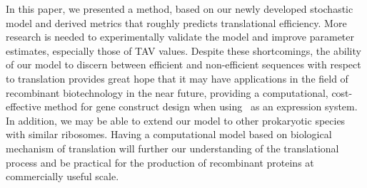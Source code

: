 \documentclass[12pt]{article}
\begin{document}
In this paper, we presented a method, based on our newly
developed stochastic model and derived metrics that roughly predicts
translational efficiency.  More research is needed to
experimentally validate the model and improve parameter
estimates, especially those of TAV values. Despite these
shortcomings, the ability of our model to discern between efficient
and non-efficient sequences with respect to translation 
provides great hope that it may have applications in the field of
recombinant biotechnology in the near future, providing a
computational, cost-effective method for gene construct
design when using \ecoli\ as an expression system.  In addition, 
we may be able to extend our model to other prokaryotic species with 
similar ribosomes.  Having a computational model based on biological
mechanism of translation will further our understanding of the
translational process and be practical for the production of
recombinant proteins at commercially useful scale.

{}
\begin{singlespace}  \end{singlespace}
\end{document}
